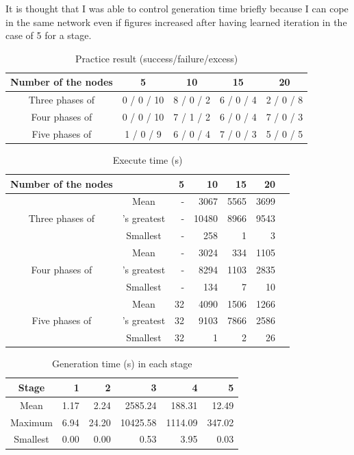 \documentclass{article}
\begin{document}
It is thought that I was able to control generation time briefly because I can cope in the same network even if figures increased after having learned iteration in the case of 5 for a stage.
\begin{table}[htbp]
\caption {Practice result (success/failure/excess)}
\label{tbl:result1}
\begin{tabular}{c|cccc}
Number of the nodes &
5&
10&
15&
20\\
\hline \hline
Three phases of &
0 / 0 / 10&
8 / 0 / 2&
6 / 0 / 4&
2 / 0 / 8\\
Four phases of &
0 / 0 / 10&
7 / 1 / 2&
6 / 0 / 4&
7 / 0 / 3\\
Five phases of &
1 / 0 / 9&
6 / 0 / 4&
7 / 0 / 3&
5 / 0 / 5\\
\hline
\end{tabular}
\end{table}
\begin{table}[htbp]
\caption {Execute time (s)}
\label{tbl:result2}
\begin{tabular}{c|crrrrr}
Number of the nodes & & 5&
10& 15&
20\\
\hline \hline
&
Mean & -& 3067& 5565& 3699\\
Three phases of &'s greatest & -& 10480& 8966& 9543\\
&
Smallest & -& 258&
1&
3\\
\hline
&
Mean & -& 3024& 334& 1105\\
Four phases of &'s greatest & -& 8294& 1103& 2835\\
&
Smallest & -& 134&
7&
10\\
\hline
&
Mean & 32& 4090& 1506& 1266\\
Five phases of &'s greatest & 32& 9103& 7866& 2586\\
&
Smallest & 32&
1&
2& 26\\
\hline
\end{tabular}
\end{table}
\begin{table}[htbp]
\caption {Generation time (s) in each stage}
\label{tbl:result3}
\begin{tabular}{c|rrrrr}
Stage &
1&
2&
3&
4&
5\\
\hline
\hline
Mean &
1.17&
2.24&
2585.24&
188.31&
12.49\\
Maximum &
6.94&
24.20&
10425.58&
1114.09&
347.02\\
Smallest &
0.00&
0.00&
0.53&
3.95&
0.03\\
\hline
\end{tabular}
\end{table}
\end{document}
